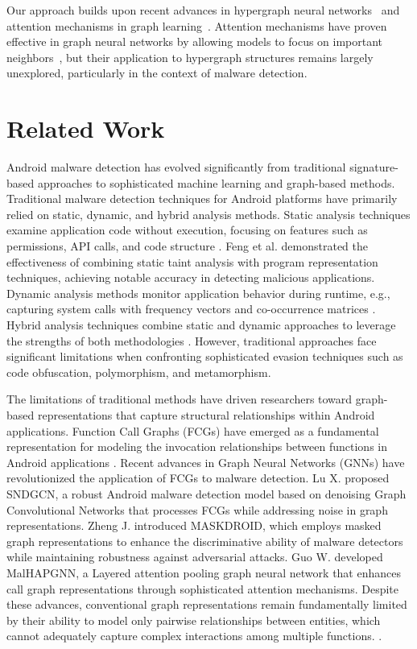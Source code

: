 \documentclass[runningheads]{llncs}
\begin{document}
Our approach builds upon recent advances in hypergraph neural networks~\cite{bai2021,gao2023} and attention mechanisms in graph learning~\cite{velickovic2018,sun2023}. Attention mechanisms have proven effective in graph neural networks by allowing models to focus on important neighbors~\cite{velickovic2018}, but their application to hypergraph structures remains largely unexplored, particularly in the context of malware detection.


\section{Related Work}
Android malware detection has evolved significantly from traditional signature-based approaches to sophisticated machine learning and graph-based methods.
Traditional malware detection techniques for Android platforms have primarily relied on static, dynamic, and hybrid analysis methods. Static analysis techniques examine application code without execution, focusing on features such as permissions, API calls, and code structure \cite{payet2012static,wu2012droidmat}. Feng et al. \cite{feng2014apposcopy} demonstrated the effectiveness of combining static taint analysis with program representation techniques, achieving notable accuracy in detecting malicious applications. Dynamic analysis methods monitor application behavior during runtime, e.g., capturing system calls with frequency vectors and co-occurrence matrices \cite{xiao2016identifying}. Hybrid analysis techniques combine static and dynamic approaches to leverage the strengths of both methodologies \cite{hybroid}. However, traditional approaches face significant limitations when confronting sophisticated evasion techniques such as code obfuscation, polymorphism, and metamorphism.

The limitations of traditional methods have driven researchers toward graph-based representations that capture structural relationships within Android applications. Function Call Graphs (FCGs) have emerged as a fundamental representation for modeling the invocation relationships between functions in Android applications \cite{gascon2013structural}. Recent advances in Graph Neural Networks (GNNs) have revolutionized the application of FCGs to malware detection. Lu X. \cite{lu2024sndgcn} proposed SNDGCN, a robust Android malware detection model based on denoising Graph Convolutional Networks that processes FCGs while addressing noise in graph representations. Zheng J. \cite{zheng2024maskdroid} introduced MASKDROID, which employs masked graph representations to enhance the discriminative ability of malware detectors while maintaining robustness against adversarial attacks. Guo W. \cite{guo2025malhapgnn} developed MalHAPGNN, a Layered attention pooling graph neural network that enhances call graph representations through sophisticated attention mechanisms. Despite these advances, conventional graph representations remain fundamentally limited by their ability to model only pairwise relationships between entities, which cannot adequately capture complex interactions among multiple functions. \cite{shokouhinejad2025recent}.
\end{document}
